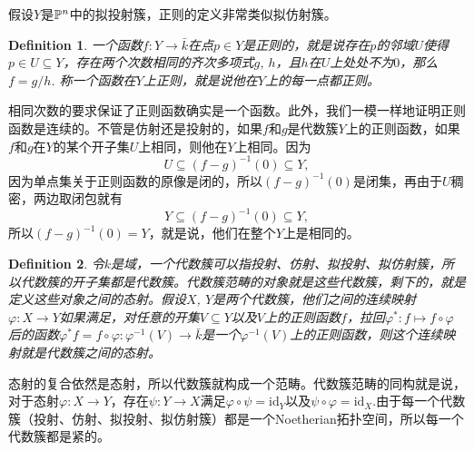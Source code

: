 \documentclass[9pt]{extbook}
\theoremstyle{plain}%
\newtheorem{defi}{Definition}[section]%
\begin{document}
假设$Y$是$\mathbb{P}^n$中的拟投射簇，正则的定义非常类似拟仿射簇。
\begin{defi}
	一个函数$f:Y\to \bar{k}$在点$p\in Y$是正则的，就是说存在$p$的邻域$U$使得$p\in U\subseteq Y$，存在两个次数相同的齐次多项式$g$, $h$，且$h$在$U$上处处不为$0$，那么$f=g/h$. 称一个函数在$Y$上正则，就是说他在$Y$上的每一点都正则。
\end{defi}
相同次数的要求保证了正则函数确实是一个函数。此外，我们一模一样地证明正则函数是连续的。不管是仿射还是投射的，如果$f$和$g$是代数簇$Y$上的正则函数，如果$f$和$g$在$Y$的某个开子集$U$上相同，则他在$Y$上相同。因为
\[
	U\subseteq (f-g)^{-1}(0)\subseteq Y,
\]
因为单点集关于正则函数的原像是闭的，所以$(f-g)^{-1}(0)$是闭集，再由于$U$稠密，两边取闭包就有
\[
	Y\subseteq (f-g)^{-1}(0)\subseteq Y,
\]
所以$(f-g)^{-1}(0)=Y$，就是说，他们在整个$Y$上是相同的。
\begin{defi}
令$k$是域，一个代数簇可以指投射、仿射、拟投射、拟仿射簇，所以代数簇的开子集都是代数簇。代数簇范畴的对象就是这些代数簇，剩下的，就是定义这些对象之间的态射。假设$X$, $Y$是两个代数簇，他们之间的连续映射$\varphi:X\to Y$如果满足，对任意的开集$V\subseteq Y$以及$V$上的正则函数$f$，拉回$\varphi^*:f\mapsto f\circ \varphi$后的函数$\varphi^* f=f\circ \varphi:\varphi^{-1}(V)\to \bar{k}$是一个$\varphi^{-1}(V)$上的正则函数，则这个连续映射就是代数簇之间的态射。
\end{defi}
态射的复合依然是态射，所以代数簇就构成一个范畴。代数簇范畴的同构就是说，对于态射$\varphi:X\to Y$，存在$\psi:Y\to X$满足$\varphi\circ \psi=\mathrm{id}_Y$以及$\psi\circ \varphi=\mathrm{id}_X$.由于每一个代数簇（投射、仿射、拟投射、拟仿射簇）都是一个Noetherian拓扑空间，所以每一个代数簇都是紧的。
\end{document}
